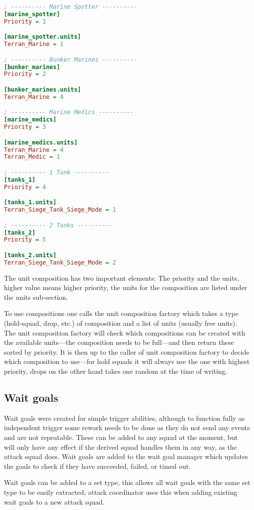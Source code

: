 \begin{lstlisting}[caption={Hold squad unit compositions},label={lst:unit_composition_defense},language=ini]
; ---------- Marine Spotter ----------
[marine_spotter]
Priority = 1

[marine_spotter.units]
Terran_Marine = 1

; ---------- Bunker Marines ----------
[bunker_marines]
Priority = 2

[bunker_marines.units]
Terran_Marine = 4

; ---------- Marine Medics ----------
[marine_medics]
Priority = 3

[marine_medics.units]
Terran_Marine = 4
Terran_Medic = 1

; ---------- 1 Tank ----------
[tanks_1]
Priority = 4

[tanks_1.units]
Terran_Siege_Tank_Siege_Mode = 1

; ---------- 2 Tanks ----------
[tanks_2]
Priority = 5

[tanks_2.units]
Terran_Siege_Tank_Siege_Mode = 2
\end{lstlisting}
The unit composition has two important elements: The priority and the units, higher value means higher priority, the units for the composition are listed under the units sub-section.

To use compositions one calls the unit composition factory which takes a type (hold-squad, drop, etc.) of composition and a list of units (usually free units). The unit composition factory will check which compositions can be created with the available units—the composition needs to be full—and then return these sorted by priority. It is then up to the caller of unit composition factory to decide which composition to use—for hold squads it will always use the one with highest priority, drops on the other hand takes one random at the time of writing.

\subsection{Wait goals}
\label{sec:wait_goals}
Wait goals were created for simple trigger abilities, although to function fully as independent trigger some rework needs to be done as they do not send any events and are not repeatable. These can be added to any squad at the moment, but will only have any effect if the derived squad handles them in any way, as the attack squad does. Wait goals are added to the wait goal manager which updates the goals to check if they have succeeded, failed, or timed out.

Wait goals can be added to a set type, this allows all wait goals with the same set type to be easily extracted; attack coordinator uses this when adding existing wait goals to a new attack squad.